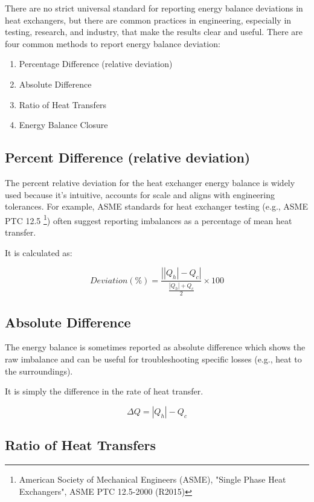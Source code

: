 \documentclass[12pt]{article}
\begin{document}
There are no strict universal standard for reporting energy balance deviations in heat exchangers, but there are common practices in engineering, especially in testing, research, and industry, that make the results clear and useful. There are four common methods to report energy balance deviation:

\begin{enumerate}
	\item Percentage Difference (relative deviation)
	\item Absolute Difference
	\item Ratio of Heat Transfers
	\item Energy Balance Closure
\end{enumerate}

\subsection{Percent Difference (relative deviation)}

The percent relative deviation for the heat exchanger energy balance is widely used because it's intuitive, accounts for scale and aligns with engineering tolerances. For example, ASME standards for heat exchanger testing (e.g., ASME PTC 12.5 \footnote{American Society of Mechanical Engineers (ASME), "Single Phase Heat Exchangers", ASME PTC 12.5-2000 (R2015)}) often suggest reporting imbalances as a percentage of mean heat transfer.

It is calculated as:

\begin{equation}
	{Deviation (\%)} = \frac{\left| |Q_h| - Q_c \right|}{\frac{|Q_h| + Q_c}{2}} \times 100
\end{equation}

\subsection{Absolute Difference}

The energy balance is sometimes reported as absolute difference which shows the raw imbalance and can be useful for troubleshooting specific losses (e.g., heat to the surroundings). 

It is simply the difference in the rate of heat transfer.

\begin{equation}
	{\Delta{Q}=|Q_h| - Q_c}
\end{equation}


\subsection{Ratio of Heat Transfers}
\end{document}
